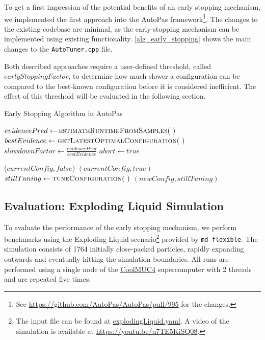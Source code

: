 \documentclass[conference]{IEEEtran}
\begin{document}
To get a first impression of the potential benefits of an early stopping mechanism, we implemented the first approach into the AutoPas framework\footnote{
    See \href{https://github.com/AutoPas/AutoPas/pull/995}{
        https://github.com/AutoPas/AutoPas/pull/995} for the changes.
}. The changes to the existing codebase are minimal, as the early-stopping mechanism can be implemented using existing functionality. \autoref{alg_early_stopping} shows the main changes to the \texttt{AutoTuner.cpp} file.

Both described approaches require a user-defined threshold, called $earlyStoppingFactor$, to determine how much slower a configuration can be compared to the best-known configuration before it is considered inefficient. The effect of this threshold will be evaluated in the following section.
\begin{algorithm}[h]
    \small
    \caption{Early Stopping Algorithm in AutoPas}
    \label{alg_early_stopping}
    \begin{algorithmic}[1]
        \State \Return
        \EndIf
        \State $evidencePred \gets \Call{estimateRuntimeFromSamples}{~}$
        \State $bestEvidence \gets \Call{getLatestOptimalConfiguration}{~}$
        \State $slowdownFactor \gets \frac{evidencePred}{bestEvidence}$
        \State $abort \gets true$
        \EndIf
        \EndProcedure

        \vspace{0.2em}

        \State \Return ($currentConfig, false)$
            \State \Return $(currentConfig, true)$
            \Else
            \State $stillTuning \gets \Call{tuneConfiguration}{~}$
            \State \Return $(newConfig, stillTuning)$
        \EndIf
        \EndProcedure
    \end{algorithmic}
\end{algorithm}

\subsection{Evaluation: Exploding Liquid Simulation}
\label{sec:evaluation}

To evaluate the performance of the early stopping mechanism, we perform benchmarks using the Exploding Liquid scenario\footnote{
    The input file can be found at \href{
        https://github.com/AutoPas/AutoPas/blob/master/examples/md-flexible/input/explodingLiquid.yaml}{explodingLiquid.yaml}.
    A video of the simulation is available at \url{https://youtu.be/u7TE5KiSQ08}.
} provided by \texttt{md-flexible}. The simulation consists of 1764 initially close-packed particles, rapidly expanding outwards and eventually hitting the simulation boundaries. All runs are performed using a single node of the \href{https://doku.lrz.de/coolmuc-4-1082337877.html}{CoolMUC4} supercomputer with 2 threads and are repeated five times.
\end{document}
